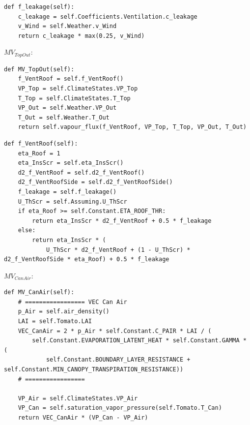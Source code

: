 \documentclass[a4paper]{article}
\begin{document}
\begin{mdframed}[leftline=false,rightline=false,backgroundcolor=magenta!10,nobreak=true]
  \begin{verbatim}
def f_leakage(self):
    c_leakage = self.Coefficients.Ventilation.c_leakage
    v_Wind = self.Weather.v_Wind
    return c_leakage * max(0.25, v_Wind)
  \end{verbatim}
\end{mdframed}

\(MV_{TopOut}\):
\begin{mdframed}[leftline=false,rightline=false,backgroundcolor=magenta!10,nobreak=true]
  \begin{verbatim}
def MV_TopOut(self):
    f_VentRoof = self.f_VentRoof()
    VP_Top = self.ClimateStates.VP_Top
    T_Top = self.ClimateStates.T_Top
    VP_Out = self.Weather.VP_Out
    T_Out = self.Weather.T_Out
    return self.vapour_flux(f_VentRoof, VP_Top, T_Top, VP_Out, T_Out)
  \end{verbatim}
\end{mdframed}
\begin{mdframed}[leftline=false,rightline=false,backgroundcolor=magenta!10,nobreak=true]
  \begin{verbatim}
def f_VentRoof(self):
    eta_Roof = 1
    eta_InsScr = self.eta_InsScr()
    d2_f_VentRoof = self.d2_f_VentRoof()
    d2_f_VentRoofSide = self.d2_f_VentRoofSide()
    f_leakage = self.f_leakage()
    U_ThScr = self.Assuming.U_ThScr
    if eta_Roof >= self.Constant.ETA_ROOF_THR:
        return eta_InsScr * d2_f_VentRoof + 0.5 * f_leakage
    else:
        return eta_InsScr * (
            U_ThScr * d2_f_VentRoof + (1 - U_ThScr) * d2_f_VentRoofSide * eta_Roof) + 0.5 * f_leakage
  \end{verbatim}
\end{mdframed}

\(MV_{CanAir}\):
\begin{mdframed}[leftline=false,rightline=false,backgroundcolor=magenta!10,nobreak=true]
  \begin{verbatim}
def MV_CanAir(self):
    # ================= VEC Can Air
    p_Air = self.air_density()
    LAI = self.Tomato.LAI
    VEC_CanAir = 2 * p_Air * self.Constant.C_PAIR * LAI / (
        self.Constant.EVAPORATION_LATENT_HEAT * self.Constant.GAMMA * (
            self.Constant.BOUNDARY_LAYER_RESISTANCE + self.Constant.MIN_CANOPY_TRANSPIRATION_RESISTANCE))
    # =================

    VP_Air = self.ClimateStates.VP_Air
    VP_Can = self.saturation_vapor_pressure(self.Tomato.T_Can)
    return VEC_CanAir * (VP_Can - VP_Air)
  \end{verbatim}
\end{mdframed}
\end{document}
